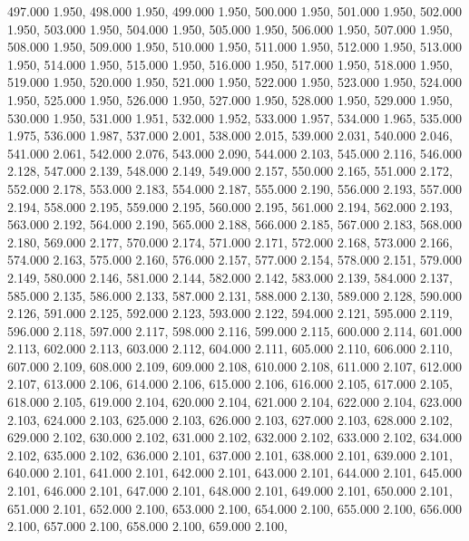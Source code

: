 497.000 1.950, 
498.000 1.950, 
499.000 1.950, 
500.000 1.950, 
501.000 1.950, 
502.000 1.950, 
503.000 1.950, 
504.000 1.950, 
505.000 1.950, 
506.000 1.950, 
507.000 1.950, 
508.000 1.950, 
509.000 1.950, 
510.000 1.950, 
511.000 1.950, 
512.000 1.950, 
513.000 1.950, 
514.000 1.950, 
515.000 1.950, 
516.000 1.950, 
517.000 1.950, 
518.000 1.950, 
519.000 1.950, 
520.000 1.950, 
521.000 1.950, 
522.000 1.950, 
523.000 1.950, 
524.000 1.950, 
525.000 1.950, 
526.000 1.950, 
527.000 1.950, 
528.000 1.950, 
529.000 1.950, 
530.000 1.950, 
531.000 1.951, 
532.000 1.952, 
533.000 1.957, 
534.000 1.965, 
535.000 1.975, 
536.000 1.987, 
537.000 2.001, 
538.000 2.015, 
539.000 2.031, 
540.000 2.046, 
541.000 2.061, 
542.000 2.076, 
543.000 2.090, 
544.000 2.103, 
545.000 2.116, 
546.000 2.128, 
547.000 2.139, 
548.000 2.149, 
549.000 2.157, 
550.000 2.165, 
551.000 2.172, 
552.000 2.178, 
553.000 2.183, 
554.000 2.187, 
555.000 2.190, 
556.000 2.193, 
557.000 2.194, 
558.000 2.195, 
559.000 2.195, 
560.000 2.195, 
561.000 2.194, 
562.000 2.193, 
563.000 2.192, 
564.000 2.190, 
565.000 2.188, 
566.000 2.185, 
567.000 2.183, 
568.000 2.180, 
569.000 2.177, 
570.000 2.174, 
571.000 2.171, 
572.000 2.168, 
573.000 2.166, 
574.000 2.163, 
575.000 2.160, 
576.000 2.157, 
577.000 2.154, 
578.000 2.151, 
579.000 2.149, 
580.000 2.146, 
581.000 2.144, 
582.000 2.142, 
583.000 2.139, 
584.000 2.137, 
585.000 2.135, 
586.000 2.133, 
587.000 2.131, 
588.000 2.130, 
589.000 2.128, 
590.000 2.126, 
591.000 2.125, 
592.000 2.123, 
593.000 2.122, 
594.000 2.121, 
595.000 2.119, 
596.000 2.118, 
597.000 2.117, 
598.000 2.116, 
599.000 2.115, 
600.000 2.114, 
601.000 2.113, 
602.000 2.113, 
603.000 2.112, 
604.000 2.111, 
605.000 2.110, 
606.000 2.110, 
607.000 2.109, 
608.000 2.109, 
609.000 2.108, 
610.000 2.108, 
611.000 2.107, 
612.000 2.107, 
613.000 2.106, 
614.000 2.106, 
615.000 2.106, 
616.000 2.105, 
617.000 2.105, 
618.000 2.105, 
619.000 2.104, 
620.000 2.104, 
621.000 2.104, 
622.000 2.104, 
623.000 2.103, 
624.000 2.103, 
625.000 2.103, 
626.000 2.103, 
627.000 2.103, 
628.000 2.102, 
629.000 2.102, 
630.000 2.102, 
631.000 2.102, 
632.000 2.102, 
633.000 2.102, 
634.000 2.102, 
635.000 2.102, 
636.000 2.101, 
637.000 2.101, 
638.000 2.101, 
639.000 2.101, 
640.000 2.101, 
641.000 2.101, 
642.000 2.101, 
643.000 2.101, 
644.000 2.101, 
645.000 2.101, 
646.000 2.101, 
647.000 2.101, 
648.000 2.101, 
649.000 2.101, 
650.000 2.101, 
651.000 2.101, 
652.000 2.100, 
653.000 2.100, 
654.000 2.100, 
655.000 2.100, 
656.000 2.100, 
657.000 2.100, 
658.000 2.100, 
659.000 2.100, 
